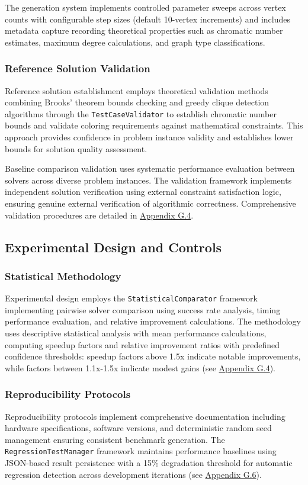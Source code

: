 The generation system implements controlled parameter sweeps across vertex counts with configurable step sizes (default 10-vertex increments) and includes metadata capture recording theoretical properties such as chromatic number estimates, maximum degree calculations, and graph type classifications.

\subsubsection{Reference Solution Validation}
Reference solution establishment employs theoretical validation methods combining Brooks' theorem bounds checking and greedy clique detection algorithms through the \texttt{Test\-Case\-Validator} to establish chromatic number bounds and validate coloring requirements against mathematical constraints. This approach provides confidence in problem instance validity and establishes lower bounds for solution quality assessment.

Baseline comparison validation uses systematic performance evaluation between solvers across diverse problem instances. The validation framework implements independent solution verification using external constraint satisfaction logic, ensuring genuine external verification of algorithmic correctness. Comprehensive validation procedures are detailed in \hyperref[appendix:test-validation]{Appendix G.4}.

\subsection{Experimental Design and Controls}

\subsubsection{Statistical Methodology}
\label{sec:statistical-methodology}
Experimental design employs the \texttt{StatisticalComparator} framework implementing pairwise solver comparison using success rate analysis, timing performance evaluation, and relative improvement calculations. The methodology uses descriptive statistical analysis with mean performance calculations, computing speedup factors and relative improvement ratios with predefined confidence thresholds: speedup factors above 1.5x indicate notable improvements, while factors between 1.1x-1.5x indicate modest gains (see \hyperref[appendix:statistical-analysis]{Appendix G.4}).

\subsubsection{Reproducibility Protocols}
Reproducibility protocols implement comprehensive documentation including hardware specifications, software versions, and deterministic random seed management ensuring consistent benchmark generation. The \texttt{RegressionTestManager} framework maintains performance baselines using JSON-based result persistence with a 15\% degradation threshold for automatic regression detection across development iterations (see \hyperref[appendix:regression-testing]{Appendix G.6}).